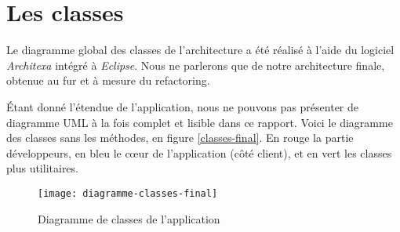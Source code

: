 \section{Les classes}

Le diagramme global des classes de l'architecture a été réalisé à l'aide du logiciel \emph{Architexa} intégré à \emph{Eclipse}. Nous ne parlerons que de notre architecture finale, obtenue au fur et à mesure du refactoring.

Étant donné l'étendue de l'application, nous ne pouvons pas présenter de diagramme UML à la fois complet et lisible dans ce rapport. Voici le diagramme des classes sans les méthodes, en figure \vref{classes-final}. En rouge la partie développeurs, en bleu le cœur de l'application (côté client), et en vert les classes plus utilitaires.

\begin{figure}[h]
\begin{center}
    \texttt{[image: diagramme-classes-final]}
\end{center}
    \caption{Diagramme de classes de l'application}
    \label{classes-final}
\end{figure}